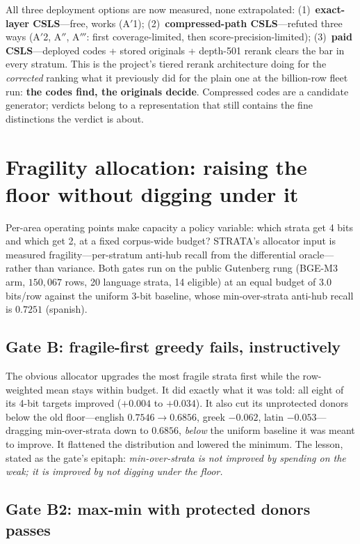\documentclass[sigconf, nonacm]{acmart}
\begin{document}
All three deployment options are now measured, none extrapolated:
(1)~\textbf{exact-layer CSLS}---free, works (A$'$1);
(2)~\textbf{compressed-path CSLS}---refuted three ways (A$'$2, A$''$,
A$'''$: first coverage-limited, then score-precision-limited);
(3)~\textbf{paid CSLS}---deployed codes + stored originals + depth-501
rerank clears the bar in every stratum. This is the project's tiered
rerank architecture doing for the \emph{corrected} ranking what it
previously did for the plain one at the billion-row fleet run:
\textbf{the codes find, the originals decide}. Compressed codes are a
candidate generator; verdicts belong to a representation that still
contains the fine distinctions the verdict is about.

\section{Fragility allocation: raising the floor without digging under it}
\label{sec:alloc}

Per-area operating points make capacity a policy variable: which strata
get 4 bits and which get 2, at a fixed corpus-wide budget? STRATA's
allocator input is measured fragility---per-stratum anti-hub recall from
the differential oracle---rather than variance. Both gates run on the
public Gutenberg rung (BGE-M3 arm, $150{,}067$ rows, 20 language strata,
14 eligible) at an equal budget of $3.0$ bits/row against the uniform
3-bit baseline, whose min-over-strata anti-hub recall is $0.7251$
(spanish).

\subsection{Gate B: fragile-first greedy fails, instructively}

The obvious allocator upgrades the most fragile strata first while the
row-weighted mean stays within budget. It did exactly what it was told:
all eight of its 4-bit targets improved ($+0.004$ to $+0.034$). It also
cut its unprotected donors below the old floor---english
$0.7546 \to 0.6856$, greek $-0.062$, latin $-0.053$---dragging
min-over-strata down to $0.6856$, \emph{below} the uniform baseline it was
meant to improve. It flattened the distribution and lowered the minimum.
The lesson, stated as the gate's epitaph: \emph{min-over-strata is not
improved by spending on the weak; it is improved by not digging under the
floor.}

\subsection{Gate B2: max-min with protected donors passes}
\end{document}

